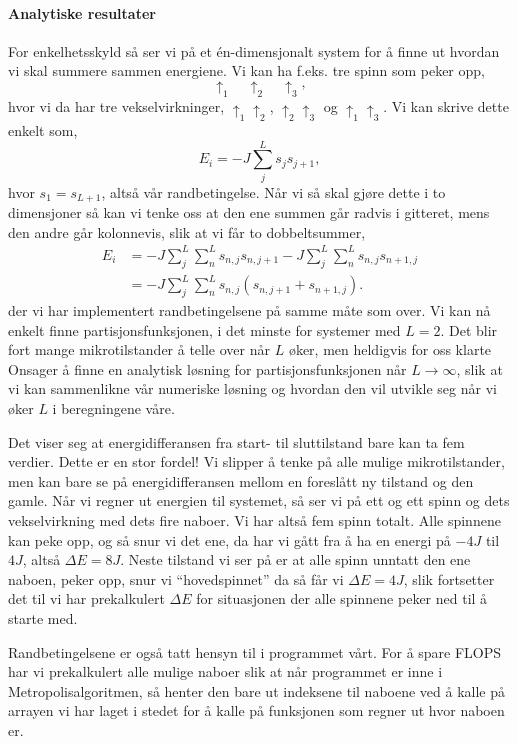 \documentclass[norsk, 10pt]{article}
\begin{document}
\paragraph{Analytiske resultater}
For enkelhetsskyld så ser vi på et én-dimensjonalt system for å finne ut hvordan vi skal summere sammen energiene. Vi kan ha f.eks. tre spinn som peker opp,
$$ \uparrow_1\quad\uparrow_2\quad\uparrow_3, $$
hvor vi da har tre vekselvirkninger, $\uparrow_1\uparrow_2$, $\uparrow_2\uparrow_3$ og $\uparrow_1\uparrow_3$. Vi kan skrive dette enkelt som,
$$ E_i = -J\sum\limits_{j}^{L} s_js_{j+1}, $$
hvor $s_1 = s_{L+1}$, altså vår randbetingelse. Når vi så skal gjøre dette i to dimensjoner så kan vi tenke oss at den ene summen går radvis i gitteret, mens den andre går kolonnevis, slik at vi får to dobbeltsummer,
\begin{align*}
	E_i &= -J\sum\limits_{j}^{L}\sum\limits_{n}^{L} s_{n,j}s_{n,j+1} - J\sum\limits_{j}^{L}\sum\limits_{n}^{L} s_{n,j}s_{n+1,j}\\
	&= -J\sum\limits_{j}^{L}\sum\limits_{n}^{L} s_{n,j}(s_{n,j+1} + s_{n+1,j}).
\end{align*}
der vi har implementert randbetingelsene på samme måte som over. Vi kan nå enkelt finne partisjonsfunksjonen, i det minste for systemer med $L=2$. Det blir fort mange mikrotilstander å telle over når $L$ øker, men heldigvis for oss klarte Onsager å finne en analytisk løsning for partisjonsfunksjonen når $L\to\infty$, slik at vi kan sammenlikne vår numeriske løsning og hvordan den vil utvikle seg når vi øker $L$ i beregningene våre.

Det viser seg at energidifferansen fra start- til sluttilstand bare kan ta fem verdier. Dette er en stor fordel! Vi slipper å tenke på alle mulige mikrotilstander, men kan bare se på energidifferansen mellom en foreslått ny tilstand og den gamle. Når vi regner ut energien til systemet, så ser vi på ett og ett spinn og dets vekselvirkning med dets fire naboer. Vi har altså fem spinn totalt. Alle spinnene kan peke opp, og så snur vi det ene, da har vi gått fra å ha en energi på $-4J$ til $4J$, altså $\Delta E = 8J$. Neste tilstand vi ser på er at alle spinn unntatt den ene naboen, peker opp, snur vi ``hovedspinnet'' da så får vi $\Delta E = 4J$, slik fortsetter det til vi har prekalkulert $\Delta E$ for situasjonen der alle spinnene peker ned til å starte med.

Randbetingelsene er også tatt hensyn til i programmet vårt. For å spare FLOPS har vi prekalkulert alle mulige naboer slik at når programmet er inne i Metropolisalgoritmen, så henter den bare ut indeksene til naboene ved å kalle på arrayen vi har laget i stedet for å kalle på funksjonen som regner ut hvor naboen er.
\end{document}
